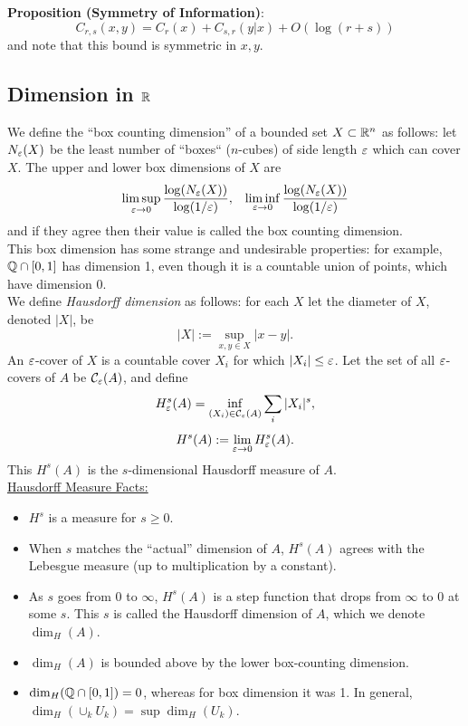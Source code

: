\documentclass{amsart}
\begin{document}
	\textbf{Proposition (Symmetry of Information)}:
	$$
	C_{r,s}(x,y) = C_r(x) + C_{s,r}(y|x) + O(\log(r+s))
	$$
	and note that this bound is symmetric in $x,y$.\\
	
	
	\subsection{Dimension in $\mathbb{R}$} We define the ``box counting dimension'' of a bounded set $X\subset \mathbb{R}^n$ as follows: let $N_{\varepsilon}(X)$ be the least number of ``boxes`` ($n$-cubes) of side length $\varepsilon$ which can cover $X$. The upper and lower box dimensions of $X$ are
	$$
	\limsup_{\varepsilon\to 0} \frac{\log(N_{\varepsilon}(X))}{\log(1/\varepsilon)}, \;\;\; \liminf_{\varepsilon\to 0} \frac{\log(N_{\varepsilon}(X))}{\log(1/\varepsilon)}
	$$
	and if they agree then their value is called the box counting dimension.\\
	
	This box dimension has some strange and undesirable properties: for example, $\mathbb{Q}\cap [0,1]$ has dimension 1, even though it is a countable union of points, which have dimension 0.\\
	
	We define \textit{Hausdorff dimension} as follows: for each $X$ let the diameter of $X$, denoted $|X|$, be 
	$$
	|X| := \sup_{x,y\in X} |x-y|.
	$$
	An $\varepsilon$-cover of $X$ is a countable cover $X_i$ for which $|X_i|\leq \varepsilon$. Let the set of all $\varepsilon$-covers of $A$ be $\mathcal{C}_{\varepsilon}(A)$, and define
	$$
	H^{s}_{\varepsilon}(A) = \inf_{(X_i)\in \mathcal{C}_{\varepsilon}(A)} \sum_i |X_i|^s,
	$$
	$$
	H^s(A) := \lim_{\varepsilon\to 0} H^s_{\varepsilon}(A).
	$$
	This $H^s(A)$ is the $s$-dimensional Hausdorff measure of $A$.\\
	
	\underline{Hausdorff Measure Facts:}
	\begin{itemize}
		\item $H^s$ is a measure for $s\geq 0$.
		\item When $s$ matches the ``actual'' dimension of $A$, $H^s(A)$ agrees with the Lebesgue measure (up to multiplication by a constant).
		\item As $s$ goes from 0 to $\infty$, $H^s(A)$ is a step function that drops from $\infty$ to $0$ at some $s$. This $s$ is called the Hausdorff dimension of $A$, which we denote $\dim_H(A)$.
		\item $\dim_H(A)$ is bounded above by the lower box-counting dimension.
		\item $\dim_H(\mathbb{Q}\cap [0,1])=0$, whereas for box dimension it was 1. In general, $\dim_H(\cup_k U_k)=\sup \dim_H(U_k)$.\\
	\end{itemize}
	
\end{document}
